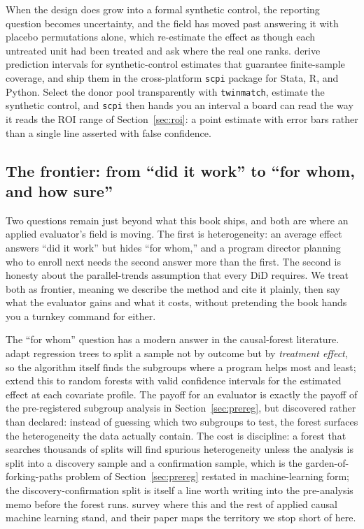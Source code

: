 When the design does grow into a formal synthetic control, the reporting question becomes uncertainty, and the field has moved past answering it with placebo permutations alone, which re-estimate the effect as though each untreated unit had been treated and ask where the real one ranks. \textcite{cattaneo2021prediction} derive prediction intervals for synthetic-control estimates that guarantee finite-sample coverage, and \textcite{cattaneo2025scpi} ship them in the cross-platform \texttt{scpi} package for Stata, R, and Python. Select the donor pool transparently with \texttt{twinmatch}, estimate the synthetic control, and \texttt{scpi} then hands you an interval a board can read the way it reads the ROI range of Section~\ref{sec:roi}: a point estimate with error bars rather than a single line asserted with false confidence.

\subsection{The frontier: from ``did it work'' to ``for whom, and how sure''}\label{ch08-sec:frontier}
Two questions remain just beyond what this book ships, and both are where an applied evaluator's field is moving. The first is heterogeneity: an average effect answers \enquote{did it work} but hides \enquote{for whom,} and a program director planning who to enroll next needs the second answer more than the first. The second is honesty about the parallel-trends assumption that every DiD requires. We treat both as frontier, meaning we describe the method and cite it plainly, then say what the evaluator gains and what it costs, without pretending the book hands you a turnkey command for either.

The \enquote{for whom} question has a modern answer in the causal-forest literature. \textcite{athey2016recursive} adapt regression trees to split a sample not by outcome but by \emph{treatment effect}, so the algorithm itself finds the subgroups where a program helps most and least; \textcite{wager2018forests} extend this to random forests with valid confidence intervals for the estimated effect at each covariate profile. The payoff for an evaluator is exactly the payoff of the pre-registered subgroup analysis in Section~\ref{sec:prereg}, but discovered rather than declared: instead of guessing which two subgroups to test, the forest surfaces the heterogeneity the data actually contain. The cost is discipline: a forest that searches thousands of splits will find spurious heterogeneity unless the analysis is split into a discovery sample and a confirmation sample, which is the garden-of-forking-paths problem of Section~\ref{sec:prereg} restated in machine-learning form; the discovery-confirmation split is itself a line worth writing into the pre-analysis memo before the forest runs. \textcite{athey2017state} survey where this and the rest of applied causal machine learning stand, and their paper maps the territory we stop short of here.

